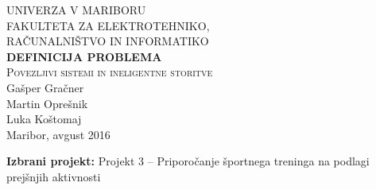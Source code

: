 \documentclass[a4paper,11pt]{article}
\begin{document}
\begin{titlepage}


\newcommand{\HRule}{\rule{\linewidth}{0.5mm}} %

\center %
 

\textsc{ UNIVERZA V MARIBORU\\ FAKULTETA ZA ELEKTROTEHNIKO,\\RAČUNALNIŠTVO IN INFORMATIKO}\\[5cm] %

{ \huge \bfseries \textbf{DEFINICIJA PROBLEMA}}\\[0.4cm] %
\textsc{\large Povezljivi sistemi in ineligentne storitve}\\[5cm] %

{\large Gašper Gračner}\\[0.4cm]
{\large Martin Oprešnik}\\[0.4cm]
{\large Luka Koštomaj}\\[0.4cm] 

\vfill %
{\large Maribor, avgust 2016}\\[3cm] %
\end{titlepage}
\newpage

\textbf{Izbrani projekt: }Projekt 3 – Priporočanje športnega treninga na podlagi prejšnjih aktivnosti \\
\end{document}
